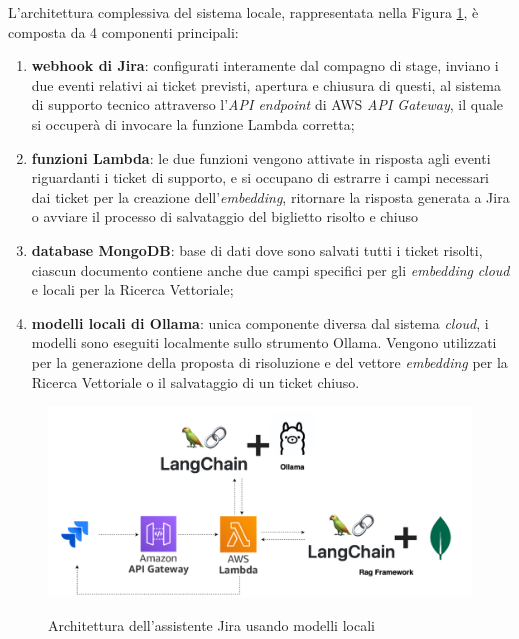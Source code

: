 L'architettura complessiva del sistema locale, rappresentata nella Figura \ref{fig:jira_ai_architecture}, è composta da 4 componenti principali:
\begin{enumerate}
    \item \textbf{webhook di Jira}: configurati interamente dal compagno di stage, inviano i due eventi relativi ai ticket previsti, apertura e chiusura di questi, al sistema di supporto tecnico attraverso l'\textit{API endpoint} di AWS \textit{API Gateway}, il quale si occuperà di invocare la funzione Lambda corretta;
    \item \textbf{funzioni Lambda}: le due funzioni vengono attivate in risposta agli eventi riguardanti i ticket di supporto, e si occupano di estrarre i campi necessari dai ticket per la creazione dell'\textit{embedding}, ritornare la risposta generata a Jira o avviare il processo di salvataggio del biglietto risolto e chiuso
    \item \textbf{database MongoDB}: base di dati dove sono salvati tutti i ticket risolti, ciascun documento contiene anche due campi specifici per gli \textit{embedding} \textit{cloud} e locali per la Ricerca Vettoriale;
    \item \textbf{modelli locali di Ollama}: unica componente diversa dal sistema \textit{cloud}, i modelli sono eseguiti localmente sullo strumento Ollama. 
    Vengono utilizzati per la generazione della proposta di risoluzione e del vettore \textit{embedding} per la Ricerca Vettoriale o il salvataggio di un ticket chiuso.
\end{enumerate}

\begin{figure}[H]
    \centering
    \includegraphics[alt={Rappresentazione ad alto livello dell'architettura dell'assistente Jira con modelli locali }, width=1\columnwidth]{img/jiraArchitettura.png}
    \caption{Architettura dell'assistente Jira usando modelli locali}
    \label{fig:jira_ai_architecture}
\end{figure}

